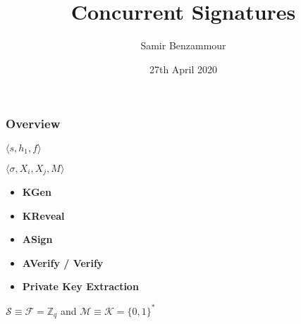 \documentclass[usenames,dvipsnames]{beamer}
\title{Concurrent Signatures}
\author{Samir Benzammour}
\date{27th April 2020}
\institute[RWTH]{
  Algorithms and Computational Complexity\\
  RWTH Aachen University
}
\newcommand{\goedel}[1]{\langle #1 \rangle}
\newcommand{\ints}{\mathbb{Z}}
\newcommand{\mespace}{\mathcal{M}}
\newcommand{\sspace}{\mathcal{S}}
\newcommand{\kspace}{\mathcal{K}}
\newcommand{\kfspace}{\mathcal{F}}
\begin{document}
\frame{\titlepage}

\begin{frame}
	\frametitle{Overview}
  \begin{center}
    \begin{description}[<+->]
      \item[\(\sigma\):] \(\goedel{s,h_1,f}\)
      \item[\(S\):] \(\goedel{\sigma, X_i, X_j, M}\)
      \item[queries:] 
        \vspace{.2cm}
          \begin{minipage}{0.35\textwidth}
            \begin{itemize}[<3->]
              \item \textbf{KGen}
              \item \textbf{KReveal}
              \item \textbf{ASign} 
            \end{itemize}
          \end{minipage}%
          \begin{minipage}{0.35\textwidth}
            \begin{itemize}[<3->]
              \item \textbf{AVerify / Verify}
              \item \textbf{Private Key Extraction}  
            \end{itemize}
          \end{minipage}\vspace{.3cm}
      \item[spaces:] $\sspace \equiv \kfspace = \ints_q$ and $\mespace \equiv \kspace = \{0,1\}^\ast$
  \end{description} 
  \end{center}
  
\end{frame}
\end{document}
